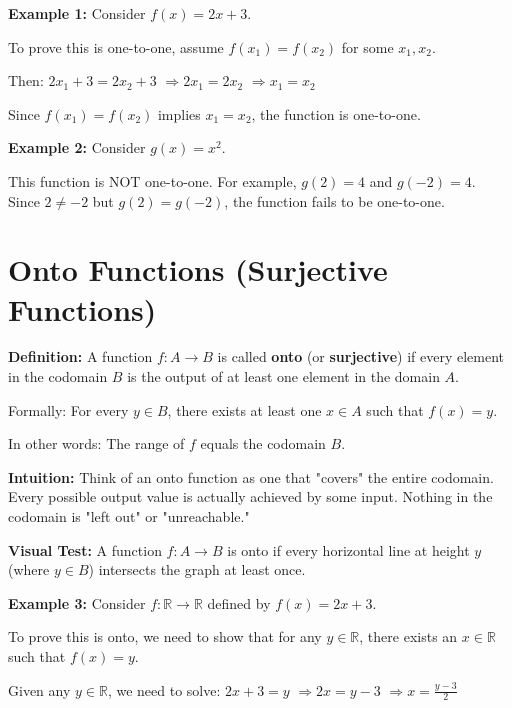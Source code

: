 \documentclass[12pt]{article}
\begin{document}
\textbf{Example 1:} Consider $f(x) = 2x + 3$.

To prove this is one-to-one, assume $f(x_1) = f(x_2)$ for some $x_1, x_2$.

Then: $2x_1 + 3 = 2x_2 + 3$
$\Rightarrow 2x_1 = 2x_2$
$\Rightarrow x_1 = x_2$

Since $f(x_1) = f(x_2)$ implies $x_1 = x_2$, the function is one-to-one.

\textbf{Example 2:} Consider $g(x) = x^2$.

This function is NOT one-to-one. For example, $g(2) = 4$ and $g(-2) = 4$. Since $2 \neq -2$ but $g(2) = g(-2)$, the function fails to be one-to-one.

\vspace{1cm}
\newpage

\section{Onto Functions (Surjective Functions)}

\textbf{Definition:} A function $f: A \to B$ is called \textbf{onto} (or \textbf{surjective}) if every element in the codomain $B$ is the output of at least one element in the domain $A$.

Formally: For every $y \in B$, there exists at least one $x \in A$ such that $f(x) = y$.

In other words: The range of $f$ equals the codomain $B$.

\vspace{0.7cm}

\textbf{Intuition:} Think of an onto function as one that "covers" the entire codomain. Every possible output value is actually achieved by some input. Nothing in the codomain is "left out" or "unreachable."

\textbf{Visual Test:} A function $f: A \to B$ is onto if every horizontal line at height $y$ (where $y \in B$) intersects the graph at least once.

\vspace{0.7cm}

\textbf{Example 3:} Consider $f: \mathbb{R} \to \mathbb{R}$ defined by $f(x) = 2x + 3$.

To prove this is onto, we need to show that for any $y \in \mathbb{R}$, there exists an $x \in \mathbb{R}$ such that $f(x) = y$.

Given any $y \in \mathbb{R}$, we need to solve: $2x + 3 = y$
$\Rightarrow 2x = y - 3$
$\Rightarrow x = \frac{y - 3}{2}$
\end{document}
